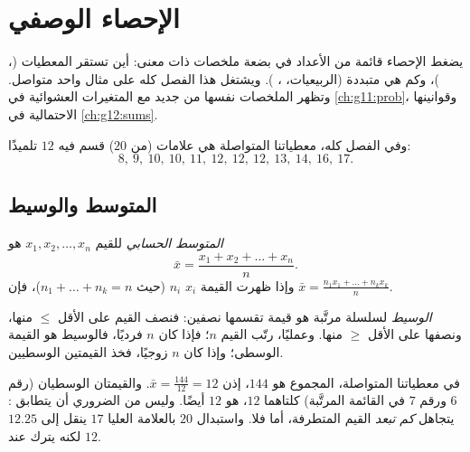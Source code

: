 \chapter{الإحصاء الوصفي}\label{ch:g11:stat}

يضغط الإحصاء قائمة من الأعداد في بضعة ملخصات ذات معنى:
أين تستقر المعطيات (، )، وكم هي متبددة (الربيعيات،
، ). ويشتغل هذا الفصل كله على مثال
واحد متواصل. وتظهر الملخصات نفسها من جديد مع المتغيرات العشوائية في
\cref{ch:g11:prob}، وقوانينها الاحتمالية في \cref{ch:g12:sums}.

وفي الفصل كله، معطياتنا المتواصلة هي علامات (من $20$)
قسم فيه $12$ تلميذًا:
\[
8,\ 9,\ 10,\ 10,\ 11,\ 12,\ 12,\ 12,\ 13,\ 14,\ 16,\ 17 .
\]

\section{المتوسط والوسيط}

\begin{definition}[المتوسط]\label{def:g11:stat:mean}
\emph{المتوسط الحسابي} للقيم $x_1, x_2, \dots, x_n$ هو
\[
\bar x = \frac{x_1 + x_2 + \dots + x_n}{n}.
\]
وإذا ظهرت القيمة $x_i$  $n_i$ (حيث
$n_1 + \dots + n_k = n$)، فإن
$\bar x = \frac{n_1 x_1 + \dots + n_k x_k}{n}$.
\end{definition}

\begin{definition}[الوسيط]\label{def:g11:stat:median}
\emph{الوسيط} لسلسلة مرتَّبة هو قيمة تقسمها
نصفين: فنصف القيم على الأقل $\leq$ منها، ونصفها على الأقل
$\geq$ منها. وعمليًا، رتّب القيم $n$؛ فإذا كان $n$ فرديًا، فالوسيط هو
القيمة الوسطى؛ وإذا كان $n$ زوجيًا، فخذ  القيمتين
الوسطيين.
\end{definition}

\begin{example}\label{ex:g11:stat:meanmedian}
في معطياتنا المتواصلة، المجموع هو $144$، إذن $\bar x = \frac{144}{12} =
12$. والقيمتان الوسطيان (رقم $6$ ورقم $7$ في القائمة المرتَّبة) كلتاهما
$12$،  هو $12$ أيضًا. وليس من الضروري أن يتطابق  :
 يتجاهل \emph{كم تبعد} القيم المتطرفة، أما  فلا.
واستبدال $20$ بالعلامة العليا $17$ ينقل  إلى $12.25$ لكنه يترك
 عند $12$.
\end{example}

